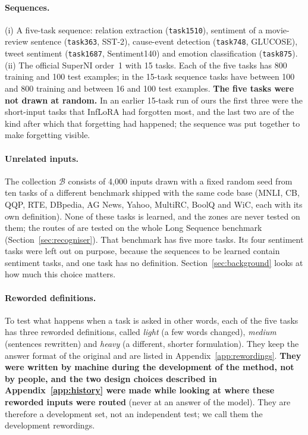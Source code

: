 \paragraph{Sequences.} (i) A five-task sequence: relation extraction (\texttt{task1510}), sentiment
of a movie-review sentence (\texttt{task363}, SST-2), cause-event detection (\texttt{task748},
GLUCOSE), tweet sentiment (\texttt{task1687}, Sentiment140) and emotion classification
(\texttt{task875}). (ii) The official SuperNI order~1 with 15 tasks. Each of the five tasks has 800
training and 100 test examples; in the 15-task sequence tasks have between 100 and 800 training and
between 16 and 100 test examples. \textbf{The five tasks were not drawn at random.} In an earlier
15-task run of ours the first three were the short-input tasks that InfLoRA had forgotten most, and
the last two are of the kind after which that forgetting had happened; the sequence was put
together to make forgetting visible.

\paragraph{Unrelated inputs.} The collection $\mathcal{B}$ consists of 4{,}000 inputs drawn with a
fixed random seed from ten tasks of a different benchmark shipped with the same code base (MNLI, CB,
QQP, RTE, DBpedia, AG News, Yahoo, MultiRC, BoolQ and WiC, each with its own definition). None of
these tasks is learned, and the zones are never tested on them; the routes of \recog{} are tested
on the whole Long Sequence benchmark (Section~\ref{sec:recogniser}). That benchmark has five more tasks. Its four sentiment tasks
were left out on purpose, because the sequences to be learned contain sentiment tasks, and one task
has no definition. Section~\ref{sec:background} looks at how much this choice matters.

\paragraph{Reworded definitions.} To test what happens when a task is asked in other words, each of
the five tasks has three reworded definitions, called \emph{light} (a few words changed),
\emph{medium} (sentences rewritten) and \emph{heavy} (a different, shorter formulation). They keep the
answer format of the original and are listed in Appendix~\ref{app:rewordings}. \textbf{They were
written by machine during the development of the method, not by people, and the two design choices described in
Appendix~\ref{app:history} were made while looking at where these reworded inputs were routed} (never
at an answer of the model). They are therefore a development set, not an independent test; we call them the development rewordings.

